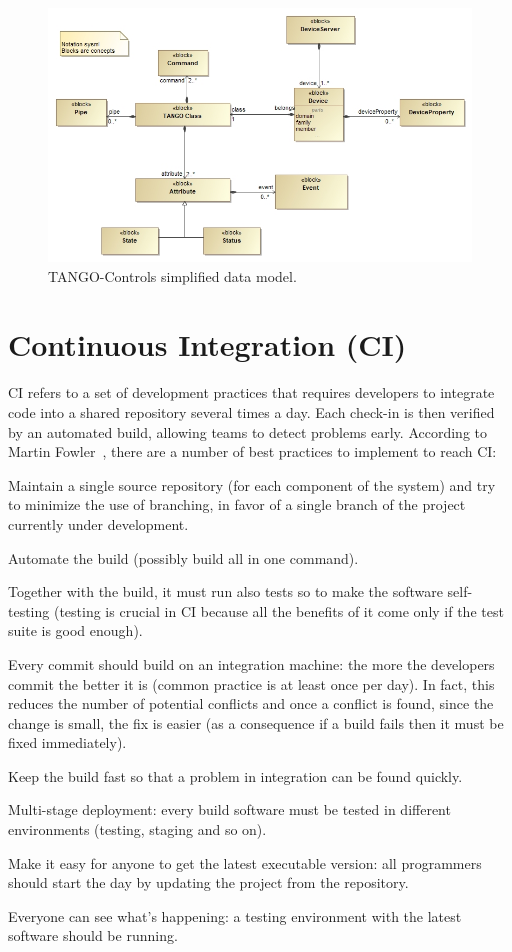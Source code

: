 \documentclass[a4paper,
               keeplastbox,   %
               ]{jacow}
\begin{document}
\begin{figure}[!htb]
   \centering
   \includegraphics*[width=1\columnwidth]{SimplifiedDataModel}
   \caption{TANGO-Controls simplified data model.}
   \label{fig:tangodatamodel}
\end{figure}

\section{Continuous Integration (CI)}
CI refers to a set of development practices that requires developers to integrate code into a shared repository several times a day. Each check-in is then verified by an automated build, allowing teams to detect problems early.
According to Martin Fowler~\cite{CI}, there are a number of best practices to implement to reach CI: 
\begin{Itemize}
    \item Maintain a single source repository (for each component of the system) and try to minimize the use of branching, in favor of a single branch of the project currently under development. 
    \item Automate the build (possibly build all in one command).
    \item Together with the build, it must run also tests so to make the software self-testing (testing is crucial in CI because all the benefits of it come only if the test suite is good enough).
    \item Every commit should build on an integration machine: the more the developers commit the better it is (common practice is at least once per day). In fact, this reduces the number of potential conflicts and once a conflict is found, since the change is small, the fix is easier (as a consequence if a build fails then it must be fixed immediately).
    \item Keep the build fast so that a problem in integration can be found quickly.
    \item Multi-stage deployment: every build software must be tested in different environments (testing, staging and so on).
    \item Make it easy for anyone to get the latest executable version: all programmers should start the day by updating the project from the repository.
    \item Everyone can see what’s happening: a testing environment with the latest software should be running.
\end{Itemize}
\end{document}
